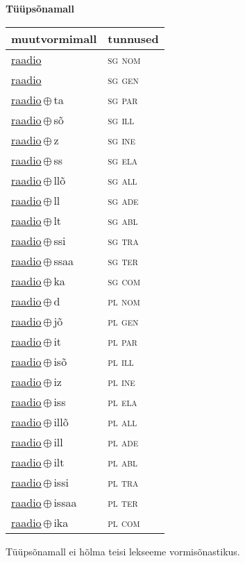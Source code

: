 

\vspace{3.5em}
\noindent \begin{minipage}{\textwidth}
\noindent \textbf{Tüüpsõnamall \,}\\

\begin{sideways}
\begin{tabular}{l l}
muutvormimall & tunnused \\
\hline
\underline{raadio} & \textsc{ sg nom } \\
\underline{raadio} & \textsc{ sg gen } \\
\underline{raadio}\,$\oplus$\,ta & \textsc{ sg par } \\
\underline{raadio}\,$\oplus$\,sõ & \textsc{ sg ill } \\
\underline{raadio}\,$\oplus$\,z & \textsc{ sg ine } \\
\underline{raadio}\,$\oplus$\,ss & \textsc{ sg ela } \\
\underline{raadio}\,$\oplus$\,llõ & \textsc{ sg all } \\
\underline{raadio}\,$\oplus$\,ll & \textsc{ sg ade } \\
\underline{raadio}\,$\oplus$\,lt & \textsc{ sg abl } \\
\underline{raadio}\,$\oplus$\,ssi & \textsc{ sg tra } \\
\underline{raadio}\,$\oplus$\,ssaa & \textsc{ sg ter } \\
\underline{raadio}\,$\oplus$\,ka & \textsc{ sg com } \\
\underline{raadio}\,$\oplus$\,d & \textsc{ pl nom } \\
\underline{raadio}\,$\oplus$\,jõ & \textsc{ pl gen } \\
\underline{raadio}\,$\oplus$\,it & \textsc{ pl par } \\
\underline{raadio}\,$\oplus$\,isõ & \textsc{ pl ill } \\
\underline{raadio}\,$\oplus$\,iz & \textsc{ pl ine } \\
\underline{raadio}\,$\oplus$\,iss & \textsc{ pl ela } \\
\underline{raadio}\,$\oplus$\,illõ & \textsc{ pl all } \\
\underline{raadio}\,$\oplus$\,ill & \textsc{ pl ade } \\
\underline{raadio}\,$\oplus$\,ilt & \textsc{ pl abl } \\
\underline{raadio}\,$\oplus$\,issi & \textsc{ pl tra } \\
\underline{raadio}\,$\oplus$\,issaa & \textsc{ pl ter } \\
\underline{raadio}\,$\oplus$\,ika & \textsc{ pl com } \\
\end{tabular}
\end{sideways}
\label{tab:tüüpsõnamall-raadio}

\end{minipage}

 
\vspace{1em}
\noindent Tüüpsõnamall  ei hõlma teisi lekseeme vormi\-sõnastikus.
